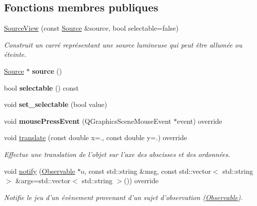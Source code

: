 \subsection*{Fonctions membres publiques}
\begin{DoxyCompactItemize}
\item 
\hyperlink{classSourceView_a978bb2492cf5379d407ee448f554dda6}{Source\+View} (const \hyperlink{classSource}{Source} \&source, bool selectable=false)
\begin{DoxyCompactList}\small\item\em Construit un carré représentant une source lumineuse qui peut être allumée ou éteinte. \end{DoxyCompactList}\item 
\hypertarget{classSourceView_a39b5010fa2f3c764638d0c01eb97f616}{\hyperlink{classSource}{Source} $\ast$ {\bfseries source} ()}\label{classSourceView_a39b5010fa2f3c764638d0c01eb97f616}

\item 
\hypertarget{classSourceView_ab6c051d55846c3880a8f2672650327aa}{bool {\bfseries selectable} () const }\label{classSourceView_ab6c051d55846c3880a8f2672650327aa}

\item 
\hypertarget{classSourceView_a64f81b9f42abf51e39b4b16fb8be3dff}{void {\bfseries set\+\_\+selectable} (bool value)}\label{classSourceView_a64f81b9f42abf51e39b4b16fb8be3dff}

\item 
\hypertarget{classSourceView_a04947a9f3d8c575b61c03d869be66408}{void {\bfseries mouse\+Press\+Event} (Q\+Graphics\+Scene\+Mouse\+Event $\ast$event) override}\label{classSourceView_a04947a9f3d8c575b61c03d869be66408}

\item 
void \hyperlink{classSourceView_a96144eb5f08c6dc6b378fa604bb626a2}{translate} (const double x=., const double y=.) override
\begin{DoxyCompactList}\small\item\em Effectue une translation de l’objet sur l’axe des abscisses et des ordonnées. \end{DoxyCompactList}\item 
void \hyperlink{classSourceView_a615ac7a3f10992488cccf60fd89044b0}{notify} (\hyperlink{classObservable}{Observable} $\ast$o, const std\+::string \&msg, const std\+::vector$<$ std\+::string $>$ \&args=std\+::vector$<$ std\+::string $>$()) override
\begin{DoxyCompactList}\small\item\em Notifie le jeu d'un évènement provenant d'un sujet d'observation (\hyperlink{classObservable}{Observable}). \end{DoxyCompactList}\end{DoxyCompactItemize}
